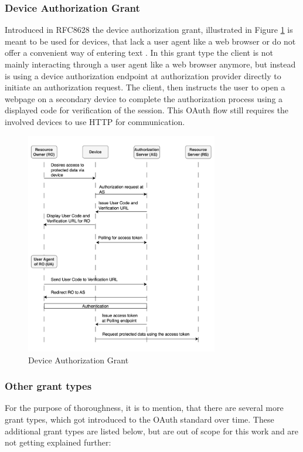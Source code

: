 \documentclass[
    fontsize=12pt,
    headings=small,
    parskip=half,           %
    bibliography=totoc,
    numbers=noenddot,       %
    open=any,               %
    ]{scrreprt}
\begin{document}
\subsubsection{Device Authorization Grant}
Introduced in RFC8628 the device authorization grant, illustrated in Figure \ref{fig:device_authorization_grant} is meant to be used for
devices, that lack a user agent like a web browser or do not offer a convenient
way of entering text \cite{denniss2019oauth}. In this grant type the client is
not mainly interacting through a user agent like a web browser anymore, but instead is using a device authorization endpoint at authorization provider directly to initiate an authorization request. The client, then instructs the user to open a webpage on a secondary device to complete the authorization process using a displayed code for verification of the session. This OAuth flow still requires the involved devices to use HTTP for communication.

\begin{figure}[H]
	\sffamily\footnotesize
	\includegraphics[width=0.75\textwidth]{pic/device_authorization_grant.png}
	\unitlength=0.75mm
	\linethickness{0.4pt}
	\caption{Device Authorization Grant}
	\label{fig:device_authorization_grant}
\end{figure}

\subsubsection{Other grant types}
For the purpose of thoroughness, it is to mention, that there are several more grant types, which got introduced to the OAuth standard over time. These additional grant types are listed below, but are out of scope for this work and are not getting explained further: 
\end{document}
